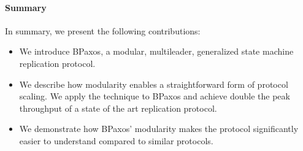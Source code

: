 
\paragraph{Summary}
In summary, we present the following contributions:
\begin{itemize}
  \item
    We introduce BPaxos, a modular, multileader, generalized state machine
    replication protocol.
  \item
    We describe how modularity enables a straightforward form of protocol
    scaling. We apply the technique to BPaxos and achieve double the peak
    throughput of a state of the art replication protocol.
  \item
    We demonstrate how BPaxos' modularity makes the protocol significantly
    easier to understand compared to similar protocols.
\end{itemize}
